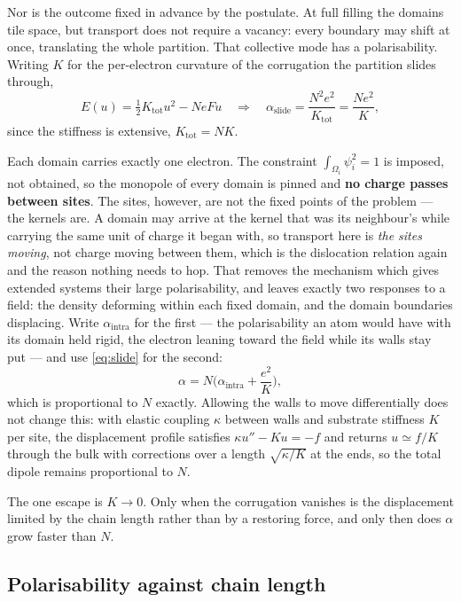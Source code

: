 \documentclass[11pt]{article}
\begin{document}
Nor is the outcome fixed in advance by the postulate. At full filling the domains tile space, but
transport does not require a vacancy: every boundary may shift at once, translating the whole
partition. That collective mode has a polarisability. Writing $K$ for the per-electron curvature
of the corrugation the partition slides through,
\begin{equation}
E(u) = \tfrac12 K_{\text{tot}}u^2 - NeFu
\quad\Longrightarrow\quad
\alpha_{\text{slide}} = \frac{N^2e^2}{K_{\text{tot}}} = \frac{Ne^2}{K},
\label{eq:slide}
\end{equation}
since the stiffness is extensive, $K_{\text{tot}}=NK$.

Each domain carries exactly one electron. The constraint $\int_{\Omega_i}\psi_i^2 = 1$ is imposed,
not obtained, so the monopole of every domain is pinned and \textbf{no charge passes between
sites}. The sites, however, are not the fixed points of the problem --- the kernels are. A domain
may arrive at the kernel that was its neighbour's while carrying the same unit of charge it began
with, so transport here is \emph{the sites moving}, not charge moving between them, which is the
dislocation relation again and the reason nothing needs to hop. That removes the mechanism which gives extended systems their large polarisability, and
leaves exactly two responses to a field: the density deforming within each fixed domain, and the
domain boundaries displacing. Write $\alpha_{\text{intra}}$ for the first --- the polarisability an
atom would have with its domain held rigid, the electron leaning toward the field while its walls
stay put --- and use \eqref{eq:slide} for the second:
\begin{equation}
\alpha = N\Big(\alpha_{\text{intra}} + \frac{e^2}{K}\Big),
\label{eq:extensive}
\end{equation}
which is proportional to $N$ exactly. Allowing the walls to move differentially does not change
this: with elastic coupling $\kappa$ between walls and substrate stiffness $K$ per site, the
displacement profile satisfies $\kappa u'' - K u = -f$ and returns $u \simeq f/K$ through the bulk
with corrections over a length $\sqrt{\kappa/K}$ at the ends, so the total dipole remains
proportional to $N$.

The one escape is $K \to 0$. Only when the corrugation vanishes is the displacement limited by the
chain length rather than by a restoring force, and only then does $\alpha$ grow faster than $N$.

\subsection{Polarisability against chain length}
\end{document}
